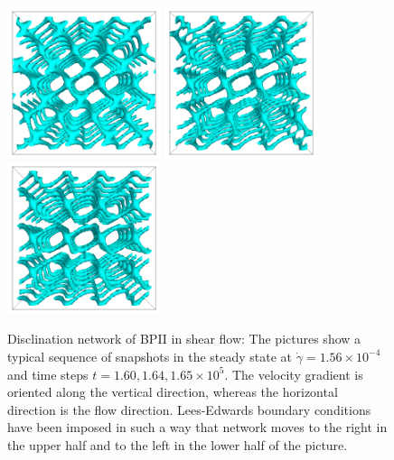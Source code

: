 \documentclass[aps,pre,reprint,superscriptaddress, twocolumn]{revtex4}
\newcommand{\e}[1]{\times10^{#1}}
\newcommand{\gd}{\dot{\gamma}}
\begin{document}
\begin{figure}[htpb]
\includegraphics[width=0.4\textwidth]{disc-160k_run902.png}
\includegraphics[width=0.4\textwidth]{disc-164k_run902.png}
\includegraphics[width=0.4\textwidth]{disc-165k_run902.png}
\caption{Disclination network of BPII in shear flow: 
The pictures show a typical sequence of snapshots in the steady state 
at $\gd=1.56\e{-4}$ and time steps $t=1.60, 1.64,1.65\e{5}$. The velocity 
gradient is oriented along the vertical direction, whereas the 
horizontal direction is the flow direction. Lees-Edwards boundary 
conditions have been imposed in such a way that network moves to the 
right in the upper half and to the left in the lower half of the picture.}
\label{bp2-med}
\end{figure}
\end{document}
